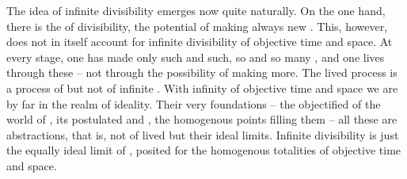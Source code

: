 The idea of infinite divisibility emerges now quite naturally. On the 
one hand, there is the  of divisibility, the potential 
of making always new . This, however, does not in 
itself account for infinite divisibility of objective time and space. 
At every stage, one has made only such and such, so and so many 
, and one lives through these -- not through the 
possibility of making more. The lived process is a process of 
 but not of infinite . 
With infinity of objective time and space we are by far in the realm of ideality. 
Their very foundations -- the {objectified}  of the world 
of , its 
postulated  and , the homogenous points filling 
them -- all these are  abstractions, that is, not 
 of lived  but their ideal limits. 
Infinite divisibility is just the equally ideal limit 
of , posited for the homogenous totalities of 
objective time and space.

